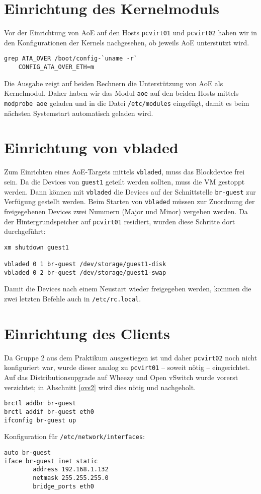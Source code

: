\section{Einrichtung des Kernelmoduls}
Vor der Einrichtung von AoE auf den Hosts \verb#pcvirt01# und \verb#pcvirt02# haben wir in den Konfigurationen der Kernels nachgesehen, ob jeweils AoE unterstützt wird. 
\setupVerbatimOut
\begin{verbatim}
grep ATA_OVER /boot/config-`uname -r`
    CONFIG_ATA_OVER_ETH=m
\end{verbatim} 
Die Ausgabe zeigt auf beiden Rechnern die Unterstützung von AoE als Kernelmodul. Daher haben wir das Modul \verb#aoe# auf den beiden Hosts mittels \verb#modprobe aoe# geladen und in die Datei \verb#/etc/modules# eingefügt, damit es beim nächsten Systemstart automatisch geladen wird. 

\section{Einrichtung von vbladed}
Zum Einrichten eines AoE-Targets mittels \verb#vbladed#, muss das Blockdevice frei sein. Da die Devices von \verb#guest1# geteilt werden sollten, muss die VM gestoppt werden. Dann können mit \verb#vbladed# die Devices auf der Schnittstelle \verb#br-guest# zur Verfügung gestellt werden. Beim Starten von \verb#vbladed# müssen zur Zuordnung der freigegebenen Devices zwei Nummern (Major und Minor) vergeben werden. Da der Hintergrundspeicher auf \verb#pcvirt01# residiert, wurden diese Schritte dort durchgeführt:
\setupVerbatimOut
\begin{verbatim}
xm shutdown guest1

vbladed 0 1 br-guest /dev/storage/guest1-disk  
vbladed 0 2 br-guest /dev/storage/guest1-swap
\end{verbatim}
Damit die Devices nach einem Neustart wieder freigegeben werden, kommen die zwei letzten Befehle auch in \verb#/etc/rc.local#. 
\section{Einrichtung des Clients}
Da Gruppe 2 aus dem Praktikum ausgestiegen ist und daher \verb#pcvirt02# noch nicht konfiguriert war, wurde dieser analog zu \verb#pcvirt01#  -- soweit nötig -- eingerichtet. Auf das Distributionsupgrade auf Wheezy und Open vSwitch wurde vorerst verzichtet; in Abschnitt \ref{ovs2} wird dies nötig und nachgeholt.
\begin{verbatim}
brctl addbr br-guest
brctl addif br-guest eth0
ifconfig br-guest up
\end{verbatim}
Konfiguration für \verb#/etc/network/interfaces#:
\setupVerbatimOut
\begin{verbatim}
auto br-guest
iface br-guest inet static
        address 192.168.1.132
        netmask 255.255.255.0
        bridge_ports eth0
\end{verbatim}

